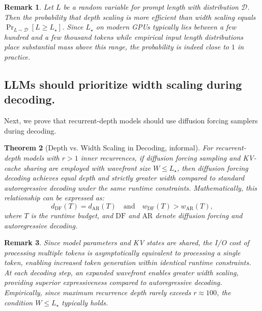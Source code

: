 \documentclass{article} %
\newtheorem{theorem}{Theorem}[section]
\theoremstyle{definition}
\theoremstyle{plain}
\newtheorem{remark}[theorem]{Remark}
\begin{document}
\begin{remark}
Let $L$ be a random variable for prompt length with distribution $\mathcal{D}$. Then the probability that depth scaling is more efficient than width scaling equals $\Pr_{L \sim \mathcal{D}}[L \geq L_\star]$. Since $L_\star$ on modern GPUs typically lies between a few hundred and a few thousand tokens while empirical input length distributions place substantial mass above this range, the probability is indeed close to $1$ in practice.
\end{remark}


\subsection{LLMs should prioritize width scaling during decoding.}

Next, we prove that recurrent-depth models should use diffusion forcing samplers during decoding.

\begin{theorem}[Depth vs. Width Scaling in Decoding, informal]
For recurrent-depth models with $r > 1$ inner recurrences, if diffusion forcing sampling and KV-cache sharing are employed with wavefront size $W \leq L_\star$, then diffusion forcing decoding achieves equal depth and strictly greater width compared to standard autoregressive decoding under the same runtime constraints. Mathematically, this relationship can be expressed as: $$d_{\text{DF}}(T) = d_{\text{AR}}(T) \quad \text{and} \quad w_{\text{DF}}(T) > w_{\text{AR}}(T),$$ where $T$ is the runtime budget, and $\text{DF}$ and $\text{AR}$ denote diffusion forcing and autoregressive decoding.
\end{theorem}

\vspace{-.1cm}
\begin{remark}
Since model parameters and KV states are shared, the I/O cost of processing multiple tokens is asymptotically equivalent to processing a single token, enabling increased token generation within identical runtime constraints. At each decoding step, an expanded wavefront enables greater width scaling, providing superior expressiveness compared to autoregressive decoding. Empirically, since maximum recurrence depth rarely exceeds $r \approx 100$, the condition $W \leq L_\star$ typically holds.
\end{remark}
\end{document}
